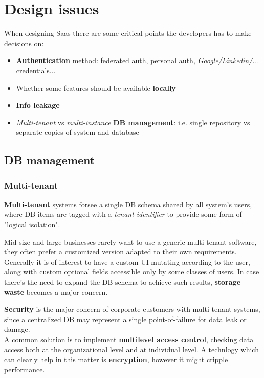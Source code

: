 \section{Design issues}
When designing Saas there are some critical points the developers has to make decisions on:
\begin{itemize}
   \item \textbf{Authentication} method: federated auth, personal auth, \textit{Google/Linkedin/...} credentials... 
   \item Whether some features should be available \textbf{locally}
   \item \textbf{Info leakage}
   \item \textit{Multi-tenant} vs \textit{multi-instance} \textbf{DB management}:
   i.e. single repository vs separate copies of system and database
\end{itemize}

\subsection{DB management}
\subsubsection{Multi-tenant}
\textbf{Multi-tenant} systems forsee a single DB schema shared by all system's users,
where DB items are tagged with a \textit{tenant identifier} to provide some form of "logical isolation".

Mid-size and large businesses rarely want to use a generic multi-tenant software, 
they often prefer a customized version adapted to their own requirements.
Generally it is of interest to have a custom UI mutating according to the user,
along with custom optional fields accessible only by some classes of users.
In case there's the need to expand the DB schema to achieve such results,
\textbf{storage waste} becomes a major concern.


\textbf{Security} is the major concern of corporate customers with multi-tenant systems,
since a centralized DB may represent a single point-of-failure for data leak or damage.\\
A common solution is to implement \textbf{multilevel access control}, checking data access both at the organizational level and at individual level.
A technlogy which can clearly help in this matter is \textbf{encryption},
however it might cripple performance.

